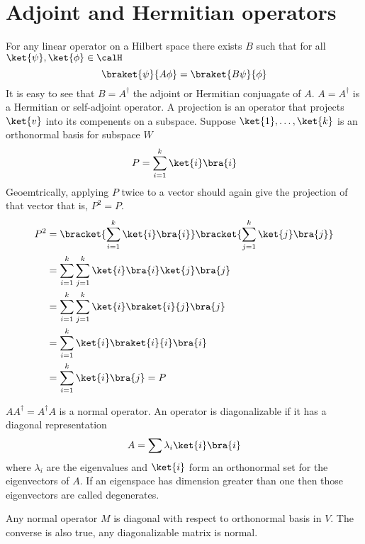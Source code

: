 \section{Adjoint and Hermitian operators}
For any linear operator on a Hilbert space there exists \(B\) such that for all \(\ket{\psi}, \ket{\phi}\in \calH\) 
\begin{equation*}
    \braket{\psi}{A\phi} = \braket{B\psi}{\phi}
\end{equation*}
It is easy to see that \(B = A^{\dagger}\) the adjoint or Hermitian conjuagate of \(A\). \(A = A^{\dagger}\) is a Hermitian or self-adjoint operator. A projection is an operator that projects \(\ket{v}\) into its compenents on a subspace. Suppose \(\ket{1} , \dots , \ket{k}\) is an orthonormal basis for subspace \(W\) 
\begin{equation*}
    P = \sum_{i = 1}^k \ket{i} \bra{i}
\end{equation*}
Geoemtrically, applying \(P\) twice to a vector should again give the projection of that vector that is, \(P^2 = P\). 
\begin{align*}
    P^2 &=  \bracket{\sum_{i = 1}^k \ket{i} \bra{i}}  \bracket{\sum_{j = 1}^k \ket{j} \bra{j}}\\
    &=  \sum_{i = 1}^k  \sum_{j = 1}^k \ket{i} \bra{i} \ket{j} \bra{j} \\
    &=  \sum_{i = 1}^k  \sum_{j = 1}^k \ket{i} \braket{i}{j} \bra{j} \\
    &= \sum_{i = 1}^k \ket{i} \braket{i}{i} \bra{i} \\
    &=  \sum_{i = 1}^k  \ket{i}  \bra{j} = P
\end{align*} 

\(A A^{\dagger} = A^{\dagger} A\) is a normal operator. An operator is diagonalizable if it has a diagonal representation 
\begin{equation*}
    A = \sum \lambda_i \ket{i} \bra{i}
\end{equation*}
where \(\lambda_i\) are the eigenvalues and \(\ket{i}\) form an orthonormal set for the eigenvectors of \(A\). If an eigenspace has dimension greater than one then those eigenvectors are called degenerates.
\begin{theorem}
    Any normal operator \(M\) is diagonal with respect to orthonormal basis in \(V\). The converse is also true, any diagonalizable matrix is normal.
\end{theorem}

